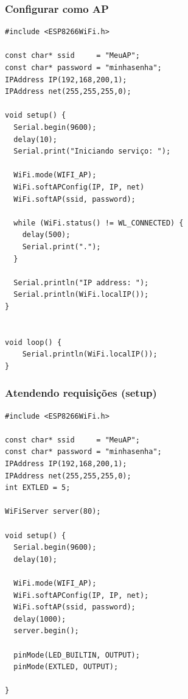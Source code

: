 \documentclass{beamer}
\begin{document}
\begin{frame}[fragile]
\frametitle{Configurar como AP}

\tiny
\begin{lstlisting}
#include <ESP8266WiFi.h>

const char* ssid     = "MeuAP";
const char* password = "minhasenha";
IPAddress IP(192,168,200,1);
IPAddress net(255,255,255,0);

void setup() {
  Serial.begin(9600);
  delay(10);
  Serial.print("Iniciando serviço: ");
  
  WiFi.mode(WIFI_AP); 
  WiFi.softAPConfig(IP, IP, net)
  WiFi.softAP(ssid, password);

  while (WiFi.status() != WL_CONNECTED) {
    delay(500);
    Serial.print(".");
  }

  Serial.println("IP address: ");
  Serial.println(WiFi.localIP());
}


void loop() {
    Serial.println(WiFi.localIP());
}
\end{lstlisting}

\end{frame}

\begin{frame}[fragile]
\frametitle{Atendendo requisições (setup)}

\tiny
\begin{lstlisting}
#include <ESP8266WiFi.h>

const char* ssid     = "MeuAP";
const char* password = "minhasenha";
IPAddress IP(192,168,200,1);
IPAddress net(255,255,255,0);
int EXTLED = 5;

WiFiServer server(80);

void setup() {
  Serial.begin(9600);
  delay(10);

  WiFi.mode(WIFI_AP); 
  WiFi.softAPConfig(IP, IP, net);
  WiFi.softAP(ssid, password);
  delay(1000);
  server.begin();

  pinMode(LED_BUILTIN, OUTPUT);
  pinMode(EXTLED, OUTPUT);

}


\end{lstlisting}

\end{frame}
\end{document}
